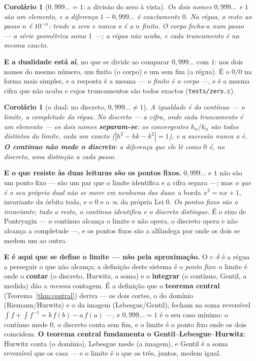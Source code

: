 \documentclass[11pt,a4paper]{article}
\newcommand{\code}[1]{\texttt{\small #1}}
\newtheorem{corolario}[teorema]{Corolário}
\begin{document}
\begin{corolario}[$0{,}999\ldots=1$: a divisão do zero à vista]\label{cor:noves}
Os dois nomes $0{,}999\ldots$ e $1$ são \emph{um} elemento, e a diferença $1-0{,}999\ldots$ é
\emph{exactamente} $0$. Na régua, o resto ao passo $n$ é $10^{-n}$: tende a zero e nunca o \emph{é} a $n$
finito. O corpo fecha-a num passo --- a série geométrica soma $1$ ---; a régua não acaba, e cada
truncamento é na mesma exacto.
\end{corolario}

\noindent \textbf{E a dualidade está aí}, no que se divide ao comparar $0{,}999\ldots$ com $1$: nos dois
nomes do mesmo número, um finito (o corpo) e um sem fim (a régua). É o $0/0$ na forma mais simples, e a
resposta é a mesma --- \emph{o finito é o corpo} ---, e é a mesma cifra que não acaba e cujos truncamentos
são todos exactos (\code{tests/zero.c}).

\begin{corolario}[o dual: no discreto, $0{,}999\ldots\neq1$]\label{cor:noves-dual}
A igualdade é do \emph{contínuo} --- o limite, a completude da régua. No \emph{discreto} --- a cifra, onde
cada truncamento é um elemento --- os dois nomes \textbf{separam-se}: os convergentes $h_n/k_n$ são todos
distintos do limite, cada um exacto ($|h^2-hk-k^2|=1$), e a sucessão nunca o \emph{é}. \textbf{O contínuo
não mede o discreto}: a diferença que ele lê como $0$ é, no discreto, uma distinção a cada passo.
\end{corolario}

\noindent \textbf{E o que resiste às duas leituras são os pontos fixos.} $0{,}999\ldots$ e $1$ não são um
ponto fixo --- são um par que o limite identifica e a cifra separa ---; mas \emph{o que é o seu próprio
dual não se move em nenhuma das duas}: a borda $x^2=nx+1$, invariante da órbita toda, e o $0$ e o $\infty$
da própria Lei $0$. \emph{Os pontos fixos são o invariante; tudo o resto, o contínuo identifica e o
discreto distingue.} É o eixo de Pontryagin --- o contínuo alcança o limite e não opera, o discreto opera
e não alcança a completude ---, e os pontos fixos são a alfândega por onde os dois se medem um ao outro.

\smallskip
\noindent \textbf{E é aqui que se define o limite --- não pela aproximação.} O $\varepsilon$--$\delta$ é a
régua a perseguir o que não alcança; a definição deste sistema é o \emph{ponto fixo}: o limite é onde o
\textbf{contar} (o discreto, Hurwitz, a soma) e o \textbf{integrar} (o contínuo, Gentil, a medida) dão a
\emph{mesma} contagem. É a definição que o \textbf{teorema central} (Teorema~\ref{thm:central}) deriva ---
os dois cortes, o do domínio (Riemann/Hurwitz) e o da imagem (Lebesgue/Gentil), fecham na soma reversível
$\int f+\int f^{-1}=b\,f(b)-a\,f(a)$ ---, e $0{,}999\ldots=1$ é o seu caso mínimo: o contínuo mede $0$, o
discreto conta sem fim, e o limite é o ponto fixo onde os dois coincidem. \textbf{O teorema central
fundamenta o Gentil--Lebesgue--Hurwitz}: Hurwitz conta (o domínio), Lebesgue mede (a imagem), e Gentil é a
soma reversível que os casa --- e o limite é o que os três, juntos, medem igual.
\end{document}
